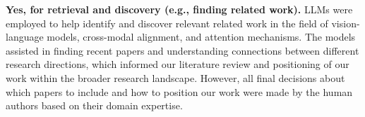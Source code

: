 \documentclass[11pt]{article}
\begin{document}
\textbf{Yes, for retrieval and discovery (e.g., finding related work).} LLMs were employed to help identify and discover relevant related work in the field of vision-language models, cross-modal alignment, and attention mechanisms. The models assisted in finding recent papers and understanding connections between different research directions, which informed our literature review and positioning of our work within the broader research landscape. However, all final decisions about which papers to include and how to position our work were made by the human authors based on their domain expertise.
\end{document}
